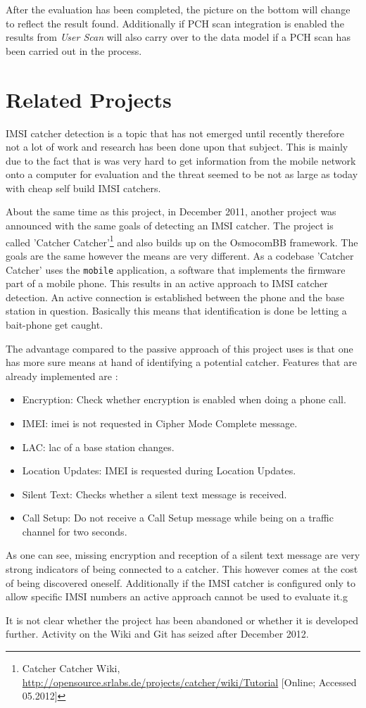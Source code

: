 After the evaluation has been completed, the picture on the bottom will change to reflect the result found.
Additionally if PCH scan integration is enabled the results from \emph{User Scan} will also carry over to the data model if a PCH scan has been carried out in the process.

\section{Related Projects}
IMSI catcher detection is a topic that has not emerged until recently therefore not a lot of work and research has been done upon that subject.
This is mainly due to the fact that is was very hard to get information from the mobile network onto a computer for evaluation and the threat seemed to be not as large as today with cheap self build IMSI catchers.

About the same time as this project, in December 2011, another project was announced with the same goals of detecting an IMSI catcher.
The project is called 'Catcher Catcher'\footnote{Catcher Catcher Wiki, \url{http://opensource.srlabs.de/projects/catcher/wiki/Tutorial} [Online; Accessed 05.2012]} and also builds up on the OsmocomBB framework.
The goals are the same however the means are very different.
As a codebase 'Catcher Catcher' uses the \texttt{mobile} application, a software that implements the firmware part of a mobile phone.
This results in an active approach to IMSI catcher detection.
An active connection is established between the phone and the base station in question.
Basically this means that identification is done be letting a bait-phone get caught.

The advantage compared to the passive approach of this project uses is that one has more sure means at hand of identifying a potential catcher.
Features that are already implemented are \cite{catcher_catcher}:
\begin{itemize}
	\item Encryption: Check whether encryption is enabled when doing a phone call.
	\item IMEI: \gls{imei} is not requested in Cipher Mode Complete message.
	\item LAC: \gls{lac} of a base station changes.
	\item Location Updates: IMEI is requested during Location Updates.
	\item Silent Text: Checks whether a silent text message is received.
	\item Call Setup: Do not receive a Call Setup message while being on a traffic channel for two seconds.
\end{itemize}
As one can see, missing encryption and reception of a silent text message are very strong indicators of being connected to a catcher.
This however comes at the cost of being discovered oneself.
Additionally if the IMSI catcher is configured only to allow specific IMSI numbers an active approach cannot be used to evaluate it.g

It is not clear whether the project has been abandoned or whether it is developed further.
Activity on the Wiki and Git has seized after December 2012.